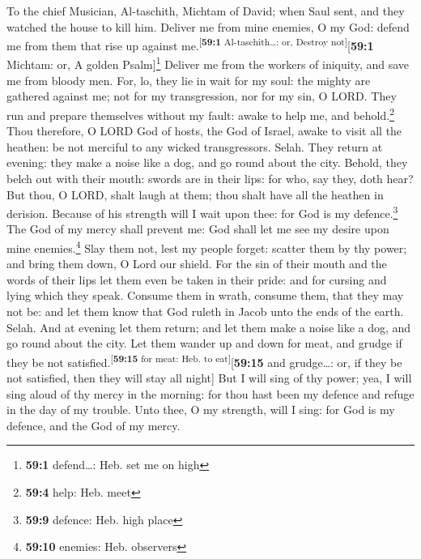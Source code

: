 To the chief Musician, Al-taschith, Michtam of David; when Saul sent,
and they watched the house to kill him.  Deliver me from
mine enemies, O my God: defend me from them that rise up against
me.\textsuperscript{{[}\textbf{59:1} Al-taschith\ldots: or, Destroy
not{]}}{[}\textbf{59:1} Michtam: or, A golden Psalm{]}\footnote{\textbf{59:1}
  defend\ldots: Heb. set me on high}  Deliver me from the
workers of iniquity, and save me from bloody men.  For,
lo, they lie in wait for my soul: the mighty are gathered against me;
not for my transgression, nor for my sin, O LORD.  They
run and prepare themselves without my fault: awake to help me, and
behold.\footnote{\textbf{59:4} help: Heb. meet}  Thou
therefore, O LORD God of hosts, the God of Israel, awake to visit all
the heathen: be not merciful to any wicked transgressors. Selah.
 They return at evening: they make a noise like a dog, and
go round about the city.  Behold, they belch out with
their mouth: swords are in their lips: for who, say they, doth hear?
 But thou, O LORD, shalt laugh at them; thou shalt have
all the heathen in derision.  Because of his strength will
I wait upon thee: for God is my defence.\footnote{\textbf{59:9} defence:
  Heb. high place}  The God of my mercy shall prevent me:
God shall let me see my desire upon mine enemies.\footnote{\textbf{59:10}
  enemies: Heb. observers}  Slay them not, lest my people
forget: scatter them by thy power; and bring them down, O Lord our
shield.  For the sin of their mouth and the words of
their lips let them even be taken in their pride: and for cursing and
lying which they speak.  Consume them in wrath, consume
them, that they may not be: and let them know that God ruleth in Jacob
unto the ends of the earth. Selah.  And at evening let
them return; and let them make a noise like a dog, and go round about
the city.  Let them wander up and down for meat, and
grudge if they be not satisfied.\textsuperscript{{[}\textbf{59:15} for
meat: Heb. to eat{]}}{[}\textbf{59:15} and grudge\ldots: or, if they be
not satisfied, then they will stay all night{]}  But I
will sing of thy power; yea, I will sing aloud of thy mercy in the
morning: for thou hast been my defence and refuge in the day of my
trouble.  Unto thee, O my strength, will I sing: for God
is my defence, and the God of my mercy.

